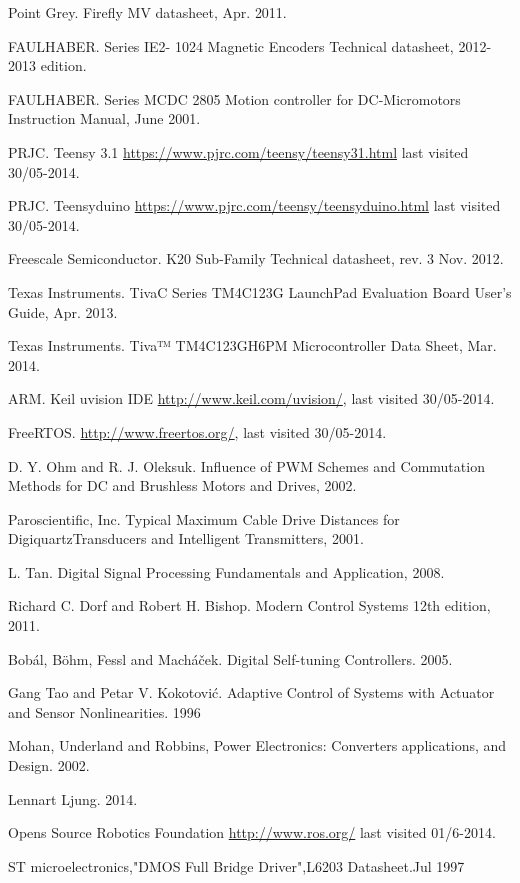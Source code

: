 \begin{thebibliography}{1}
 Point Grey. Firefly MV datasheet, Apr. 2011.

 FAULHABER. Series IE2- 1024 Magnetic Encoders Technical datasheet, 2012-2013 edition.

 FAULHABER. Series MCDC 2805 Motion controller for DC-Micromotors Instruction Manual, June 2001.

 PRJC. Teensy 3.1 \url{https://www.pjrc.com/teensy/teensy31.html} last visited 30/05-2014.

 PRJC. Teensyduino \url{https://www.pjrc.com/teensy/teensyduino.html} last visited 30/05-2014.

 Freescale Semiconductor. K20 Sub-Family Technical datasheet, rev. 3  Nov. 2012.

 Texas Instruments. Tiva\texttrademark C Series TM4C123G LaunchPad Evaluation Board User's Guide, Apr. 2013.

 Texas Instruments. Tiva™ TM4C123GH6PM Microcontroller Data Sheet, Mar. 2014.

 ARM. Keil uvision IDE \url{http://www.keil.com/uvision/}, last visited 30/05-2014.

 FreeRTOS. \url{http://www.freertos.org/}, last visited 30/05-2014.

 D. Y. Ohm and R. J. Oleksuk. Influence of PWM Schemes and Commutation Methods for DC and Brushless Motors and Drives, 2002.

 Paroscientific, Inc. Typical Maximum Cable Drive Distances for Digiquartz\textregistered Transducers and Intelligent Transmitters, 2001. 

 L. Tan. Digital Signal Processing Fundamentals and Application, 2008.

 Richard C. Dorf and Robert H. Bishop. Modern Control Systems 12th edition, 2011.

 Bobál, Böhm, Fessl and Machá\v{c}ek. Digital Self-tuning Controllers. 2005.

 Gang Tao and Petar V. Kokotovi\'{c}. Adaptive Control of Systems with Actuator and Sensor Nonlinearities. 1996

 Mohan, Underland and Robbins, Power Electronics: Converters applications, and Design. 2002.

 Lennart Ljung. 
 2014.

 Opens Source Robotics Foundation \url{http://www.ros.org/} last visited 01/6-2014.

ST microelectronics,"DMOS Full Bridge Driver",L6203 Datasheet.Jul 1997

\end{thebibliography} 

\newpage